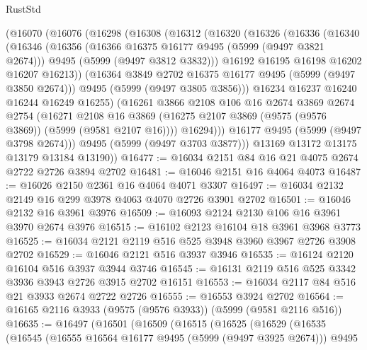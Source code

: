 \begin{lexlean}{RustStd}
\begin{coremodule}
    (@16070
      (@16076
        (@16298
          (@16308
            (@16312
              (@16320
                (@16326
                  (@16336
                    (@16340
                      (@16346
                        (@16356
                          (@16366 @16375 @16177 @9495 (@5999 (@9497 @3821 @2674)))
                          @9495
                          (@5999 (@9497 @3812 @3832)))
                        @16192
                        @16195
                        @16198
                        @16202
                        @16207
                        @16213))
                    (@16364 @3849 @2702 @16375 @16177 @9495 (@5999 (@9497 @3850 @2674)))
                    @9495
                    (@5999 (@9497 @3805 @3856)))
                  @16234
                  @16237
                  @16240
                  @16244
                  @16249
                  @16255)
                (@16261
                  @3866
                  @2108
                  @106
                  @16
                  @2674
                  @3869
                  @2674
                  @2754
                  (@16271
                    @2108
                    @16
                    @3869
                    (@16275 @2107 @3869 (@9575 (@9576 @3869)) (@5999 (@9581 @2107 @16))))
                  @16294)))
            @16177
            @9495
            (@5999 (@9497 @3798 @2674)))
          @9495
          (@5999 (@9497 @3703 @3877)))
        @13169
        @13172
        @13175
        @13179
        @13184
        @13190))
@16477 := @16034 @2151 @84 @16 @21 @4075 @2674 @2722 @2726 @3894 @2702
@16481 := @16046 @2151 @16 @4064 @4073
@16487 := @16026 @2150 @2361 @16 @4064 @4071 @3307
@16497 := @16034 @2132 @2149 @16 @299 @3978 @4063 @4070 @2726 @3901 @2702
@16501 := @16046 @2132 @16 @3961 @3976
@16509 := @16093 @2124 @2130 @106 @16 @3961 @3970 @2674 @3976
@16515 := @16102 @2123 @16104 @18 @3961 @3968 @3773
@16525 := @16034 @2121 @2119 @516 @525 @3948 @3960 @3967 @2726 @3908 @2702
@16529 := @16046 @2121 @516 @3937 @3946
@16535 := @16124 @2120 @16104 @516 @3937 @3944 @3746
@16545 := @16131 @2119 @516 @525 @3342 @3936 @3943 @2726 @3915 @2702 @16151
@16553 := @16034 @2117 @84 @516 @21 @3933 @2674 @2722 @2726
@16555 := @16553 @3924 @2702
@16564 := @16165 @2116 @3933 (@9575 (@9576 @3933)) (@5999 (@9581 @2116 @516))
@16635 := @16497
    (@16501
      (@16509
        (@16515
          (@16525
            (@16529
              (@16535
                (@16545
                  (@16555 @16564 @16177 @9495 (@5999 (@9497 @3925 @2674)))
                  @9495

\end{coremodule}
\end{lexlean}
